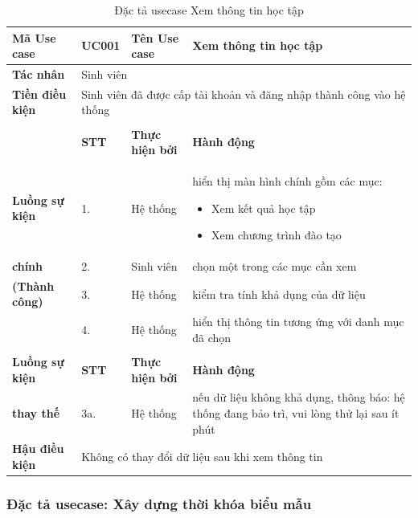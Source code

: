 \documentclass[12pt,a4paper]{report}
\begin{document}
\begin{table}[H]
\renewcommand{\arraystretch}{1.4}
\centering
\begin{tabularx}{\textwidth}{|>{\columncolor[HTML]{C6E0B4}}l|l|l|X|}
\hline
\textbf{Mã Use case} & UC001 & \textbf{Tên Use case} & Xem thông tin học tập \\ \hline
\textbf{Tác nhân} & \multicolumn{3}{l|}{Sinh viên} \\ \hline
\textbf{Tiền điều kiện} & \multicolumn{3}{l|}{Sinh viên đã được cấp tài khoản và đăng nhập thành công vào hệ thống} \\ \hline
 & \multicolumn{3}{g|}{} \\ \pagecolor{white} %
 & \cellcolor[HTML]{F8CBAD}\textbf{STT} & \cellcolor[HTML]{F8CBAD}\textbf{Thực hiện bởi} & \cellcolor[HTML]{F8CBAD}\textbf{Hành động} \\ \cline{2-4} 
\textbf{Luồng sự kiện} & 1. & Hệ thống & hiển thị màn hình chính gồm các mục: 
 \begin{itemize}[leftmargin=*, nosep]
     \item Xem kết quả học tập
     \item Xem chương trình đào tạo
 \end{itemize} \\ \cline{2-4} 
\textbf{chính} & 2. & Sinh viên & chọn một trong các mục cần xem \\ \cline{2-4} 
\textbf{(Thành công)} & 3. & Hệ thống & kiểm tra tính khả dụng của dữ liệu \\ \cline{2-4} 
 & 4. & Hệ thống & hiển thị thông tin tương ứng với danh mục đã chọn \\ \hline
 & \multicolumn{3}{g|}{} \\ 
\textbf{Luồng sự kiện} & \cellcolor[HTML]{F8CBAD}\textbf{STT} & \cellcolor[HTML]{F8CBAD}\textbf{Thực hiện bởi} & \cellcolor[HTML]{F8CBAD}\textbf{Hành động} \\ \cline{2-4} 
\textbf{thay thế} & 3a. & Hệ thống & nếu dữ liệu không khả dụng, thông báo: hệ thống đang bảo trì, vui lòng thử lại sau ít phút \\ \hline
\textbf{Hậu điều kiện} & \multicolumn{3}{l|}{Không có thay đổi dữ liệu sau khi xem thông tin} \\ \hline
\end{tabularx}
\caption{Đặc tả usecase Xem thông tin học tập}
\end{table}



\subsubsection{Đặc tả usecase: Xây dựng thời khóa biểu mẫu}
\end{document}
